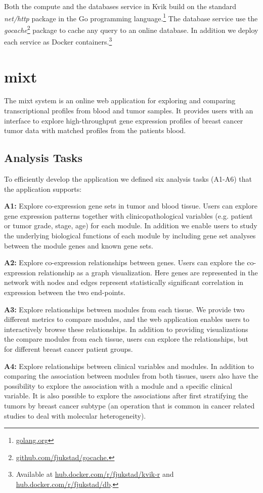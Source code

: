 Both the compute and the databases service in Kvik build on the standard
\emph{net/http} package in the Go programming
language.\footnote{\url{golang.org}} The database service use
the \emph{gocache}\footnote{\url{github.com/fjukstad/gocache.}} package to cache
any query to an online database. In addition we deploy each service as Docker
containers.\footnote{Available at \url{hub.docker.com/r/fjukstad/kvik-r} and
\url{hub.docker.com/r/fjukstad/db}.}

\section{\gls{mixt}}
The \gls{mixt} system is an online web application for exploring and comparing
transcriptional profiles from blood and tumor samples. It provides users with an
interface to explore high-throughput gene expression profiles of breast cancer
tumor data with matched profiles from the patients blood. 

\subsection{Analysis Tasks} 
To efficiently develop
the application we defined six analysis tasks (A1-A6) that the application
supports: 

\textbf{A1:} Explore co-expression gene sets in tumor and blood tissue.  Users
can explore gene expression patterns together with clinicopathological variables
(e.g. patient or tumor grade, stage, age) for each module.  In addition we
enable users to study the underlying biological functions of each module by
including gene set analyses between the module genes and known gene sets. 

\textbf{A2:} Explore co-expression relationships between genes. Users can
explore the co-expression relationship as a graph visualization. 
Here genes are represented in the network with nodes and edges represent 
statistically significant correlation in expression between the two end-points. 

\textbf{A3:} Explore relationships between modules from each tissue. We provide
two different metrics to compare modules, and the web application enables users
to interactively browse these relationships.  In addition to providing
visualizations the compare modules from each tissue, users can explore the
relationships, but for different breast cancer patient groups. 

\textbf{A4:} Explore relationships between clinical variables and modules. In
addition to comparing the association between modules from both tissues, users
also have the possibility to explore the association with a module and a
specific clinical variable. It is also possible to explore the associations
after first stratifying the tumors by breast cancer subtype (an operation that
is common in cancer related studies to deal with molecular heterogeneity).

